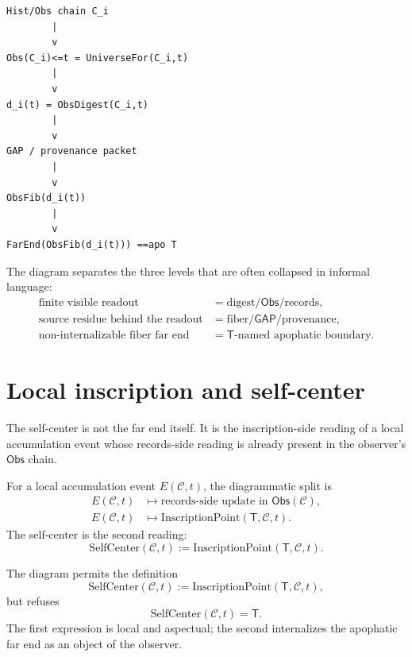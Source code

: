 \begin{center}
\begin{minipage}{0.92\textwidth}
\begin{verbatim}
Hist/Obs chain C_i
        |
        v
Obs(C_i)<=t = UniverseFor(C_i,t)
        |
        v
d_i(t) = ObsDigest(C_i,t)
        |
        v
GAP / provenance packet
        |
        v
ObsFib(d_i(t))
        |
        v
FarEnd(ObsFib(d_i(t))) ==apo T
\end{verbatim}
\end{minipage}
\end{center}

The diagram separates the three levels that are often collapsed in informal
language:
$$
\begin{aligned}
\text{finite visible readout}
&= \text{digest}/\mathsf{Obs}/\text{records},\\
\text{source residue behind the readout}
&= \text{fiber}/\mathsf{GAP}/\text{provenance},\\
\text{non-internalizable fiber far end}
&= \mathsf{T}\text{-named apophatic boundary}.
\end{aligned}
$$

\section{Local inscription and self-center}
\label{sec:far-end-diagrammatics-self-center}

The self-center is not the far end itself. It is the inscription-side reading
of a local accumulation event whose records-side reading is already present in
the observer's $\mathsf{Obs}$ chain.

\begin{definition}
\label{def:far-end-two-aspect-local-event}
For a local accumulation event $E(\mathcal{C},t)$, the diagrammatic split is
$$
\begin{aligned}
E(\mathcal{C},t)
&\longmapsto
\text{records-side update in }\mathsf{Obs}(\mathcal{C}),\\
E(\mathcal{C},t)
&\longmapsto
\mathrm{InscriptionPoint}(\mathsf{T},\mathcal{C},t).
\end{aligned}
$$
The self-center is the second reading:
$$
\mathrm{SelfCenter}(\mathcal{C},t)
:=
\mathrm{InscriptionPoint}(\mathsf{T},\mathcal{C},t).
$$
\end{definition}

\begin{principle}
\label{prin:far-end-self-center-not-identity}
The diagram permits the definition
$$
\mathrm{SelfCenter}(\mathcal{C},t)
:=
\mathrm{InscriptionPoint}(\mathsf{T},\mathcal{C},t),
$$
but refuses
$$
\mathrm{SelfCenter}(\mathcal{C},t)=\mathsf{T}.
$$
The first expression is local and aspectual; the second internalizes the
apophatic far end as an object of the observer.
\end{principle}

